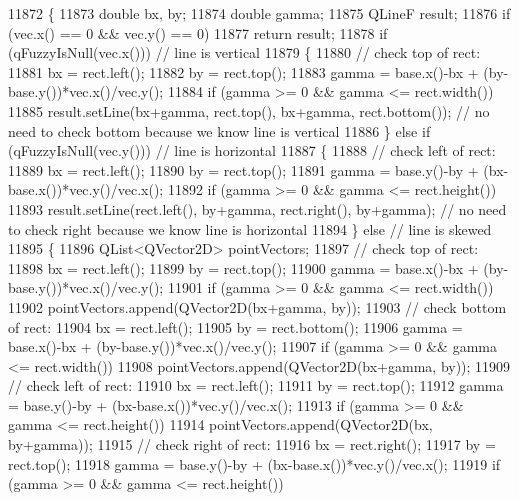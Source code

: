 \begin{DoxyCode}
11872 \textcolor{keyword}{}\{
11873   \textcolor{keywordtype}{double} bx, by;
11874   \textcolor{keywordtype}{double} gamma;
11875   QLineF result;
11876   \textcolor{keywordflow}{if} (vec.x() == 0 && vec.y() == 0)
11877     \textcolor{keywordflow}{return} result;
11878   \textcolor{keywordflow}{if} (qFuzzyIsNull(vec.x())) \textcolor{comment}{// line is vertical}
11879   \{
11880     \textcolor{comment}{// check top of rect:}
11881     bx = rect.left();
11882     by = rect.top();
11883     gamma = base.x()-bx + (by-base.y())*vec.x()/vec.y();
11884     \textcolor{keywordflow}{if} (gamma >= 0 && gamma <= rect.width())
11885       result.setLine(bx+gamma, rect.top(), bx+gamma, rect.bottom()); \textcolor{comment}{// no need to check bottom because we
       know line is vertical}
11886   \} \textcolor{keywordflow}{else} \textcolor{keywordflow}{if} (qFuzzyIsNull(vec.y())) \textcolor{comment}{// line is horizontal}
11887   \{
11888     \textcolor{comment}{// check left of rect:}
11889     bx = rect.left();
11890     by = rect.top();
11891     gamma = base.y()-by + (bx-base.x())*vec.y()/vec.x();
11892     \textcolor{keywordflow}{if} (gamma >= 0 && gamma <= rect.height())
11893       result.setLine(rect.left(), by+gamma, rect.right(), by+gamma); \textcolor{comment}{// no need to check right because we
       know line is horizontal}
11894   \} \textcolor{keywordflow}{else} \textcolor{comment}{// line is skewed}
11895   \{
11896     QList<QVector2D> pointVectors;
11897     \textcolor{comment}{// check top of rect:}
11898     bx = rect.left();
11899     by = rect.top();
11900     gamma = base.x()-bx + (by-base.y())*vec.x()/vec.y();
11901     \textcolor{keywordflow}{if} (gamma >= 0 && gamma <= rect.width())
11902       pointVectors.append(QVector2D(bx+gamma, by));
11903     \textcolor{comment}{// check bottom of rect:}
11904     bx = rect.left();
11905     by = rect.bottom();
11906     gamma = base.x()-bx + (by-base.y())*vec.x()/vec.y();
11907     \textcolor{keywordflow}{if} (gamma >= 0 && gamma <= rect.width())
11908       pointVectors.append(QVector2D(bx+gamma, by));
11909     \textcolor{comment}{// check left of rect:}
11910     bx = rect.left();
11911     by = rect.top();
11912     gamma = base.y()-by + (bx-base.x())*vec.y()/vec.x();
11913     \textcolor{keywordflow}{if} (gamma >= 0 && gamma <= rect.height())
11914       pointVectors.append(QVector2D(bx, by+gamma));
11915     \textcolor{comment}{// check right of rect:}
11916     bx = rect.right();
11917     by = rect.top();
11918     gamma = base.y()-by + (bx-base.x())*vec.y()/vec.x();
11919     \textcolor{keywordflow}{if} (gamma >= 0 && gamma <= rect.height())

\end{DoxyCode}
